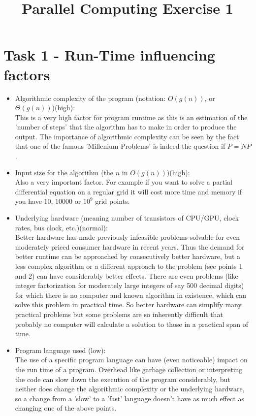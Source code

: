 \documentclass[10pt,a4paper]{article}
\title{Parallel Computing Exercise 1}
\date{}
\begin{document}
\maketitle

\section{Task 1 - Run-Time influencing factors}
\begin{itemize}
\item Algorithmic complexity of the program (notation: $O(g(n))$, or $\Theta(g(n))$)(high):\\
This is a very high factor for program runtime as this is an estimation of the 'number of steps' that the algorithm has to make in order to produce the output. The importance of algorithmic complexity can be seen by the fact that one of the famous 'Millenium Problems' is indeed the question if $P=NP$.

\item Input size for the algorithm (the $n$ in $O(g(n))$)(high):\\
Also a very important factor. For example if you want to solve a partial differential equation on a regular grid it will cost more time and memory if you have 10, 10000 or $10^9$ grid points.

\item Underlying hardware (meaning number of transistors of CPU/GPU, clock rates, bus clock, etc.)(normal):\\
Better hardware has made previously infeasible problems solvable for even moderately priced consumer hardware in recent years. Thus the demand for better runtime can be approached by consecutively better hardware, but a less complex algorithm or a different approach to the problem (see points 1 and 2) can have considerably better effects. There are even problems (like integer factorization for moderately large integers of say 500 decimal digits) for which there is no computer and known algorithm in existence, which can solve this problem in practical time. So better hardware can simplify many practical problems but some problems are so inherently difficult that probably no computer will calculate a solution to those in a practical span of time.

\item Program language used (low):\\
The use of a specific program language can have (even noticeable) impact on the run time of a program. Overhead like garbage collection or interpreting the code can slow down the execution of the program considerably, but neither does change the algorithmic complexity or the underlying hardware, so a change from a 'slow' to a 'fast' language doesn't have as much effect as changing one of the above points. 

\end{itemize}
\end{document}
